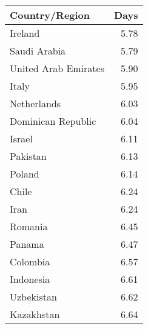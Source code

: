\begin{tabular}{lr}
\toprule
       Country/Region &  Days \\
\midrule
              Ireland &  5.78 \\
         Saudi Arabia &  5.79 \\
 United Arab Emirates &  5.90 \\
                Italy &  5.95 \\
          Netherlands &  6.03 \\
   Dominican Republic &  6.04 \\
               Israel &  6.11 \\
             Pakistan &  6.13 \\
               Poland &  6.14 \\
                Chile &  6.24 \\
                 Iran &  6.24 \\
              Romania &  6.45 \\
               Panama &  6.47 \\
             Colombia &  6.57 \\
            Indonesia &  6.61 \\
           Uzbekistan &  6.62 \\
           Kazakhstan &  6.64 \\
\bottomrule
\end{tabular}

